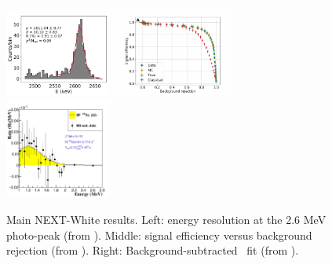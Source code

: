 \begin{figure}
  \begin{center}
    \includegraphics[width=0.31\textwidth]{img2/eres_tl208.jpg}
    \includegraphics[width=0.36\textwidth]{img2/SigEffBGRej.jpg}
    \includegraphics[width=0.31\textwidth]{img2/BGSubFit.jpg}
    \caption{Main NEXT-White results. Left: energy resolution at the 2.6 MeV  photo-peak (from \cite{Renner:2019pfe}). Middle: signal efficiency versus background rejection (from \cite{NEXT:2021pjq}). Right: Background-subtracted \bbtnu ~fit (from  \cite{nextcollaboration2021measurement}).} 
    \label{fig:newresults}
  \end{center}
\end{figure}


